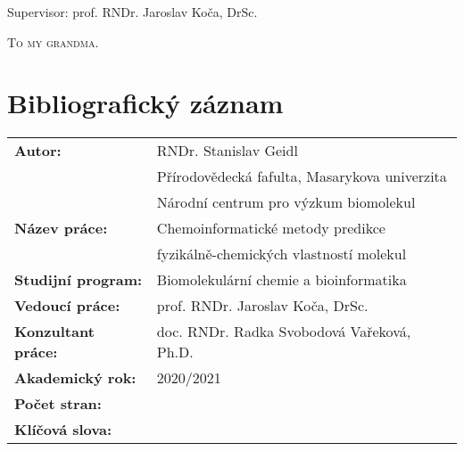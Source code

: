 \documentclass[11pt,b5paper,oneside,final]{book}
\begin{document}
\vspace*{9mm}

\begin{center}
  \fontsize{18pt}{18pt}Supervisor: prof. RNDr. Jaroslav Koča, DrSc.
\end{center}

\vfill


\begin{center}
    {\fontsize{20pt}{28pt}\selectfont{Brno 2021}} 
\end{center}
\normalsize
\clearpage

\begin{center}
\vspace*{10cm}
\textsc{To my grandma.}
\end{center}
\normalsize
\clearpage

\vfill
\section*{Bibliografický záznam}
\def\arraystretch{1.5}
\begin{tabular}{ ll } 
  \textbf{Autor:}            & RNDr. Stanislav Geidl \\
                             & Přírodovědecká fafulta, Masarykova univerzita \\
                             & Národní centrum pro výzkum biomolekul \\
  \textbf{Název práce:}      & Chemoinformatické metody predikce \\
                             & fyzikálně-chemických vlastností molekul \\
  \textbf{Studijní program:} & Biomolekulární chemie a bioinformatika \\
  \textbf{Vedoucí práce:}    & prof. RNDr. Jaroslav Koča, DrSc. \\
  \textbf{Konzultant práce:} & doc. RNDr. Radka Svobodová Vařeková, Ph.D. \\
  \textbf{Akademický rok:}   & 2020/2021 \\
  \textbf{Počet stran:}      & \\
  \textbf{Klíčová slova:}    &  \\
\end{tabular}
\normalsize
\clearpage

\vfill
\end{document}
